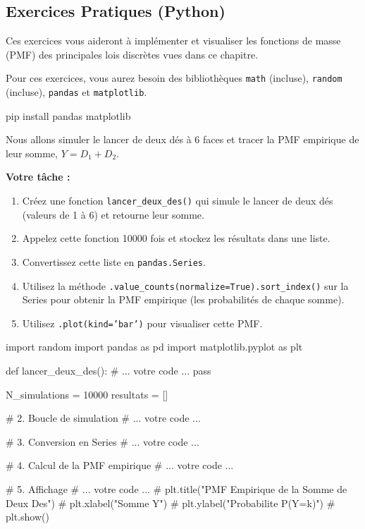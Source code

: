 \subsection{Exercices Pratiques (Python)}

Ces exercices vous aideront à implémenter et visualiser les fonctions de masse (PMF) des principales lois discrètes vues dans ce chapitre.

Pour ces exercices, vous aurez besoin des bibliothèques \texttt{math} (incluse), \texttt{random} (incluse), \texttt{pandas} et \texttt{matplotlib}.

\begin{codecell}
pip install pandas matplotlib
\end{codecell}

\begin{exercicebox}
Nous allons simuler le lancer de deux dés à 6 faces et tracer la PMF empirique de leur somme, $Y = D_1 + D_2$.

\textbf{Votre tâche :}
\begin{enumerate}
    \item Créez une fonction \texttt{lancer\_deux\_des()} qui simule le lancer de deux dés (valeurs de 1 à 6) et retourne leur somme.
    \item Appelez cette fonction 10000 fois et stockez les résultats dans une liste.
    \item Convertissez cette liste en \texttt{pandas.Series}.
    \item Utilisez la méthode \texttt{.value\_counts(normalize=True).sort\_index()} sur la Series pour obtenir la PMF empirique (les probabilités de chaque somme).
    \item Utilisez \texttt{.plot(kind='bar')} pour visualiser cette PMF.
\end{enumerate}

\begin{codecell}
import random
import pandas as pd
import matplotlib.pyplot as plt

def lancer_deux_des():
    # ... votre code ...
    pass

N_simulations = 10000
resultats = []

# 2. Boucle de simulation
# ... votre code ...

# 3. Conversion en Series
# ... votre code ...

# 4. Calcul de la PMF empirique
# ... votre code ...

# 5. Affichage
# ... votre code ...
# plt.title("PMF Empirique de la Somme de Deux Des")
# plt.xlabel("Somme Y")
# plt.ylabel("Probabilite P(Y=k)")
# plt.show()
\end{codecell}
\end{exercicebox}

